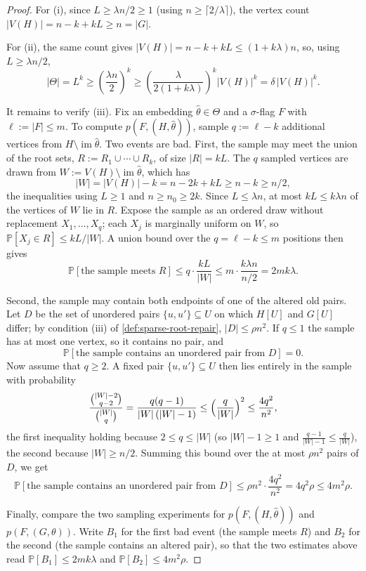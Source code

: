 \documentclass[11pt]{article}
\theoremstyle{definition}
\newcommand{\Prob}{\mathbb{P}}
\begin{document}
\begin{proof}
For (i), since $L\ge\lambda n/2\ge1$ (using $n\ge\lceil2/\lambda\rceil$), the vertex
count $|V(H)|=n-k+kL\ge n=|G|$.

For (ii), the same count gives $|V(H)|=n-k+kL\le(1+k\lambda)n$, so, using
$L\ge\lambda n/2$,
\[
  |\Theta|=L^k
  \ge\left(\frac{\lambda n}{2}\right)^k
  \ge\left(\frac{\lambda}{2(1+k\lambda)}\right)^k|V(H)|^k
  =\delta\,|V(H)|^k .
\]

It remains to verify (iii).  Fix an embedding $\widehat\theta\in\Theta$ and a
$\sigma$-flag $F$ with $\ell:=|F|\le m$.  To compute $p(F,(H,\widehat\theta))$,
sample $q:=\ell-k$ additional vertices from
$H\setminus\operatorname{im}\widehat\theta$.  Two events are bad.  First, the sample may meet the union of the
root sets, $R:=R_1\cup\cdots\cup R_k$, of size $|R|=kL$.  The $q$ sampled vertices are
drawn from $W:=V(H)\setminus\operatorname{im}\widehat\theta$, which has
\[
  |W|=|V(H)|-k=n-2k+kL\ge n-k\ge n/2,
\]
the inequalities using $L\ge1$ and $n\ge n_0\ge2k$.  Since $L\le\lambda n$, at most
$kL\le k\lambda n$ of the vertices of $W$ lie in $R$.  Expose the sample as an ordered
draw without replacement $X_1,\dots,X_q$; each $X_j$ is marginally uniform on $W$, so
$\Prob[X_j\in R]\le kL/|W|$.  A union bound over the $q=\ell-k\le m$ positions then gives
\[
  \Prob[\text{the sample meets }R]
  \le q\cdot\frac{kL}{|W|}
  \le m\cdot\frac{k\lambda n}{n/2}
  =2mk\lambda.
\]

Second, the sample may contain both endpoints of one of the altered old pairs.  Let $D$ be
the set of unordered pairs $\{u,u'\}\subseteq U$ on which $H[U]$ and $G[U]$ differ; by
condition (iii) of \cref{def:sparse-root-repair}, $|D|\le\rho n^2$.  If $q\le1$ the sample
has at most one vertex, so it contains no pair, and
\[
  \Prob[\text{the sample contains an unordered pair from }D] = 0 .
\]
Now assume that $q\ge2$.  A fixed pair $\{u,u'\}\subseteq U$ then lies entirely in the sample with probability
\[
  \frac{\binom{|W|-2}{q-2}}{\binom{|W|}{q}}
  =\frac{q(q-1)}{|W|\,(|W|-1)}
  \le\Bigl(\frac{q}{|W|}\Bigr)^{2}
  \le\frac{4q^2}{n^2},
\]
the first inequality holding because $2\le q\le|W|$ (so $|W|-1\ge1$ and
$\tfrac{q-1}{|W|-1}\le\tfrac{q}{|W|}$), the second because $|W|\ge n/2$.  Summing this bound
over the at
most $\rho n^2$ pairs of $D$, we get
\[
  \Prob[\text{the sample contains an unordered pair from }D] \leq 
  \rho n^2\cdot\frac{4q^2}{n^2}=4q^2\rho\le4m^2\rho.
\]

Finally, compare the two sampling experiments for $p(F,(H,\widehat\theta))$ and
$p(F,(G,\theta))$.  Write $B_1$ for the first bad event (the
sample meets $R$) and $B_2$ for the second (the sample contains an altered pair), so that the
two estimates above read $\Prob[B_1]\le2mk\lambda$ and $\Prob[B_2]\le4m^2\rho$.


\end{proof}
\end{document}

